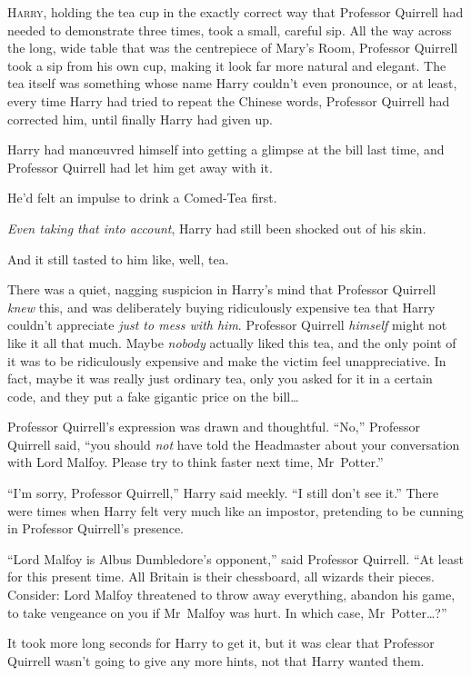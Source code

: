 
\lettrine{H}{arry}, holding the tea cup in the exactly correct way that Professor Quirrell had needed to demonstrate three times, took a small, careful sip. All the way across the long, wide table that was the centrepiece of Mary’s Room, Professor Quirrell took a sip from his own cup, making it look far more natural and elegant. The tea itself was something whose name Harry couldn’t even pronounce, or at least, every time Harry had tried to repeat the Chinese words, Professor Quirrell had corrected him, until finally Harry had given up.

Harry had manœuvred himself into getting a glimpse at the bill last time, and Professor Quirrell had let him get away with it.

He’d felt an impulse to drink a Comed-Tea first.

\emph{Even taking that into account}, Harry had still been shocked out of his skin.

And it still tasted to him like, well, tea.

There was a quiet, nagging suspicion in Harry’s mind that Professor Quirrell \emph{knew} this, and was deliberately buying ridiculously expensive tea that Harry couldn’t appreciate \emph{just to mess with him}. Professor Quirrell \emph{himself} might not like it all that much. Maybe \emph{nobody} actually liked this tea, and the only point of it was to be ridiculously expensive and make the victim feel unappreciative. In fact, maybe it was really just ordinary tea, only you asked for it in a certain code, and they put a fake gigantic price on the bill…

Professor Quirrell’s expression was drawn and thoughtful.
“No,” Professor Quirrell said, “you should \emph{not} have told the Headmaster about your conversation with Lord Malfoy. Please try to think faster next time, Mr~Potter.”

“I’m sorry, Professor Quirrell,” Harry said meekly.
“I still don’t see it.” There were times when Harry felt very much like an impostor, pretending to be cunning in Professor Quirrell’s presence.

“Lord Malfoy is Albus Dumbledore’s opponent,” said Professor Quirrell.
“At least for this present time. All Britain is their chessboard, all wizards their pieces. Consider: Lord Malfoy threatened to throw away everything, abandon his game, to take vengeance on you if Mr~Malfoy was hurt. In which case, Mr~Potter…?”

It took more long seconds for Harry to get it, but it was clear that Professor Quirrell wasn’t going to give any more hints, not that Harry wanted them.

